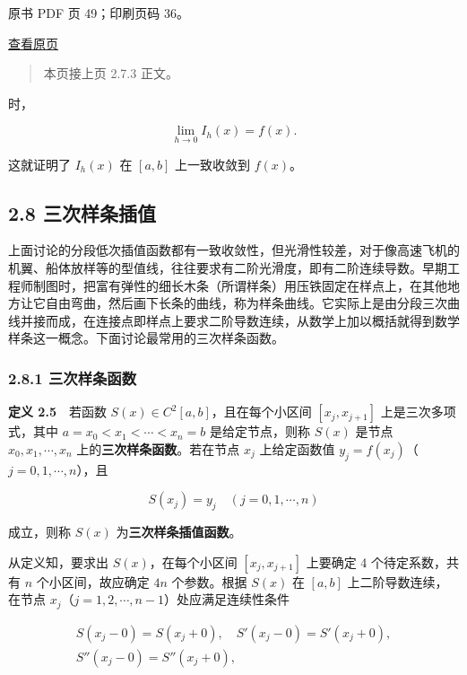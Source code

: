 \clearpage

原书 PDF 页 49；印刷页码 36。

\href{source-images/pdf-049.jpeg}{查看原页}

\begin{quote}
本页接上页 2.7.3 正文。
\end{quote}

时，

\[\lim_{h\to0}I_h(x)=f(x).\]

这就证明了 \(I_h(x)\) 在 \([a,b]\) 上一致收敛到 \(f(x)\)。

\subsection{2.8 三次样条插值}\label{ch02b-ux4e09ux6b21ux6837ux6761ux63d2ux503c}

上面讨论的分段低次插值函数都有一致收敛性，但光滑性较差，对于像高速飞机的机翼、船体放样等的型值线，往往要求有二阶光滑度，即有二阶连续导数。早期工程师制图时，把富有弹性的细长木条（所谓样条）用压铁固定在样点上，在其他地方让它自由弯曲，然后画下长条的曲线，称为样条曲线。它实际上是由分段三次曲线并接而成，在连接点即样点上要求二阶导数连续，从数学上加以概括就得到数学样条这一概念。下面讨论最常用的三次样条函数。

\subsubsection{2.8.1 三次样条函数}\label{ch02b-ux4e09ux6b21ux6837ux6761ux51fdux6570}

\textbf{定义 2.5}　若函数 \(S(x)\in C^2[a,b]\)，且在每个小区间 \([x_j,x_{j+1}]\) 上是三次多项式，其中 \(a=x_0<x_1<\cdots<x_n=b\) 是给定节点，则称 \(S(x)\) 是节点 \(x_0,x_1,\cdots,x_n\) 上的\textbf{三次样条函数}。若在节点 \(x_j\) 上给定函数值 \(y_j=f(x_j)\)（\(j=0,1,\cdots,n\)），且

\[S(x_j)=y_j\quad(j=0,1,\cdots,n)\tag{2.8.1}\]

成立，则称 \(S(x)\) 为\textbf{三次样条插值函数}。

从定义知，要求出 \(S(x)\)，在每个小区间 \([x_j,x_{j+1}]\) 上要确定 4 个待定系数，共有 \(n\) 个小区间，故应确定 \(4n\) 个参数。根据 \(S(x)\) 在 \([a,b]\) 上二阶导数连续，在节点 \(x_j\)（\(j=1,2,\cdots,n-1\)）处应满足连续性条件

\[\begin{gathered}
S(x_j-0)=S(x_j+0),\quad S'(x_j-0)=S'(x_j+0),\\
S''(x_j-0)=S''(x_j+0),
\end{gathered}\tag{2.8.2}\]

